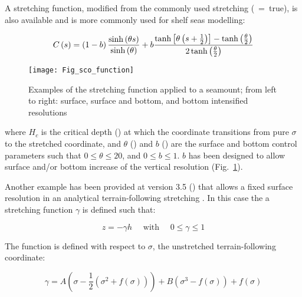 \documentclass[NEMO_book]{subfiles}
\begin{document}
A stretching function, modified from the commonly used \citet{Song_Haidvogel_JCP94} stretching (~=~true), is also available and is more commonly used for shelf seas modelling:

\begin{equation}
  C\left(s\right) =   \left(1 - b \right)\frac{ \sinh\left( \theta s\right)}{\sinh\left(\theta\right)} +      \\
  b\frac{ \tanh \left[ \theta \left(s + \frac{1}{2} \right)\right] - \tanh\left(\frac{\theta}{2}\right)}{ 2\tanh\left (\frac{\theta}{2}\right)}
  \label{eq:SH94_2}
\end{equation}

\begin{figure}[!ht]    \begin{center}
\texttt{[image: Fig\_sco\_function]}
\caption{  \label{Fig_sco_function}   
Examples of the stretching function applied to a seamount; from left to right: 
surface, surface and bottom, and bottom intensified resolutions}
\end{center}   \end{figure}

where $H_c$ is the critical depth () at which the coordinate transitions from pure $\sigma$ to the stretched coordinate,  and $\theta$ () and $b$ () are the surface and 
bottom control parameters such that $0\leqslant \theta \leqslant 20$, and 
$0\leqslant b\leqslant 1$. $b$ has been designed to allow surface and/or bottom 
increase of the vertical resolution (Fig.~\ref{Fig_sco_function}).

Another example has been provided at version 3.5 () that allows a fixed surface resolution in an analytical terrain-following stretching \citet{Siddorn_Furner_OM12}. In this case the a stretching function $\gamma$ is defined such that:

\begin{equation}
z = -\gamma h \quad \text{ with } \quad 0 \leq \gamma \leq 1
\label{eq:z}
\end{equation}

The function is defined with respect to $\sigma$, the unstretched terrain-following coordinate:

\begin{equation} \label{DOM_gamma_deriv}
\gamma= A\left(\sigma-\frac{1}{2}\left(\sigma^{2}+f\left(\sigma\right)\right)\right)+B\left(\sigma^{3}-f\left(\sigma\right)\right)+f\left(\sigma\right)
\end{equation}
\end{document}
